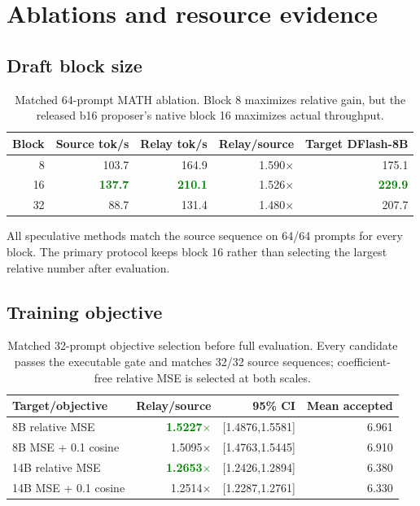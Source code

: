\documentclass[10pt]{article}
\newcommand{\good}[1]{\textbf{\textcolor{green}{#1}}}
\begin{document}
\section{Ablations and resource evidence}

\subsection{Draft block size}

\begin{table}[H]
\centering
\small
\begin{tabular}{@{}rrrrr@{}}
\toprule
Block & Source tok/s & Relay tok/s & Relay/source & Target DFlash-8B \\
\midrule
8 & 103.7 & 164.9 & 1.590$\times$ & 175.1 \\
16 & \good{137.7} & \good{210.1} & 1.526$\times$ & \good{229.9} \\
32 & 88.7 & 131.4 & 1.480$\times$ & 207.7 \\
\bottomrule
\end{tabular}
\caption{Matched 64-prompt MATH ablation. Block 8 maximizes relative gain,
but the released b16 proposer's native block 16 maximizes actual throughput.}
\end{table}

All speculative methods match the source sequence on 64/64 prompts for every
block. The primary protocol keeps block 16 rather than selecting the largest
relative number after evaluation.

\subsection{Training objective}

\begin{table}[H]
\centering
\small
\begin{tabular}{@{}lrrr@{}}
\toprule
Target/objective & Relay/source & 95\% CI & Mean accepted \\
\midrule
8B relative MSE & \good{1.5227$\times$} & [1.4876,1.5581] & 6.961 \\
8B MSE + 0.1 cosine & 1.5095$\times$ & [1.4763,1.5445] & 6.910 \\
14B relative MSE & \good{1.2653$\times$} & [1.2426,1.2894] & 6.380 \\
14B MSE + 0.1 cosine & 1.2514$\times$ & [1.2287,1.2761] & 6.330 \\
\bottomrule
\end{tabular}
\caption{Matched 32-prompt objective selection before full evaluation. Every
candidate passes the executable gate and matches 32/32 source sequences;
coefficient-free relative MSE is selected at both scales.}
\end{table}
\end{document}

